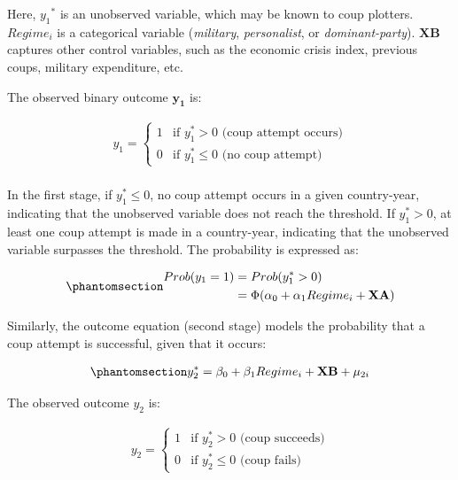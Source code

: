 \documentclass[
  12pt,
]{report}
\begin{document}
Here, \({y_1}^*\) is an unobserved variable, which may be known to coup
plotters. \(Regime_i\) is a categorical variable (\emph{military},
\emph{personalist}, or \emph{dominant-party}). \(\mathbf{XB}\) captures
other control variables, such as the economic crisis index, previous
coups, military expenditure, etc.

The observed binary outcome \(\mathbf{y_1}\) is:

\[
\begin{aligned}
y_1 = 
\begin{cases} 
1 &\text{if $y_1^*>0$ (coup attempt occurs)} \\
0 &\text{if $y_1^*\le0$ (no coup attempt)}
\end{cases}
\end{aligned}
\]\\
In the first stage, if \(y_1^*\le0\), no coup attempt occurs in a given
country-year, indicating that the unobserved variable does not reach the
threshold. If \(y_1^*>0\), at least one coup attempt is made in a
country-year, indicating that the unobserved variable surpasses the
threshold. The probability is expressed as:

\begin{equation}\phantomsection\label{eq-eq4a}{
\begin{aligned}
Prob(y_1 =1)&=Prob(y_{1}^*>0) \\
&=\Phi(\alpha_0 + \alpha_1 Regime_i + \mathbf{XA})
\end{aligned}
}\end{equation}

Similarly, the outcome equation (second stage) models the probability
that a coup attempt is successful, given that it occurs:

\begin{equation}\phantomsection\label{eq-eq5}{
\begin{aligned}
y_2^*=\beta_0 + \beta_1 Regime_i + \mathbf {XB} + \mu_{2i}
\end{aligned}
}\end{equation}

The observed outcome \(y_2\) is:

\[
\begin{aligned}
y_2 = 
\begin{cases} 
1 &\text{if $y_2^*>0$ (coup succeeds)} \\
0 &\text{if $y_2^*\le0$ (coup fails)}
\end{cases}
\end{aligned}
\]
\end{document}
